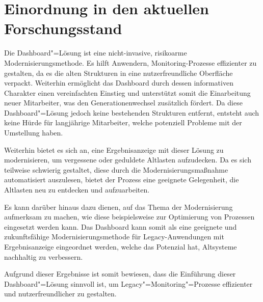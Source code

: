 \section{Einordnung in den aktuellen Forschungsstand}

Die Dash\-board"=Lösung ist eine nicht-invasive, risikoarme Modernisierungsmethode. Es hilft Anwendern, Monitoring-Prozesse effizienter zu gestalten, da es die alten Strukturen in eine nutzerfreundliche Oberfläche verpackt.
Weiterhin ermöglicht das Dash\-board durch dessen informativen Charakter einen vereinfachten Einstieg und unterstützt somit die Einarbeitung neuer Mitarbeiter, was den Generationenwechsel zusätzlich fördert.
Da diese Dash\-board"=Lösung jedoch keine bestehenden Strukturen entfernt, entsteht auch keine Hürde für langjährige Mitarbeiter, welche potenziell Probleme mit der Umstellung haben.

Weiterhin bietet es sich an, eine Ergebnisanzeige mit dieser Lösung zu modernisieren, um vergessene oder geduldete Altlasten aufzudecken. Da es sich teilweise schwierig gestaltet, diese durch die Modernisierungsmaßnahme automatisiert auszulesen, bietet der Prozess eine geeignete Gelegenheit, die Altlasten neu zu entdecken und aufzuarbeiten.

Es kann darüber hinaus dazu dienen, auf das Thema der Modernisierung aufmerksam zu machen, wie diese beispielsweise zur Optimierung von Prozessen eingesetzt werden kann. Das Dash\-board kann somit als eine geeignete und zukunftsfähige Modernisierungsmethode für Legacy-Anwendungen mit Er\-geb\-nis\-an\-zeige eingeordnet werden, welche das Potenzial hat, Altsysteme nachhaltig zu verbessern.

Aufgrund dieser Ergebnisse ist somit bewiesen, dass die Einführung dieser Dash\-board"=Lösung sinnvoll ist, um Legacy"=Monitoring"=Prozesse effizienter und nutzerfreundlicher zu gestalten.

